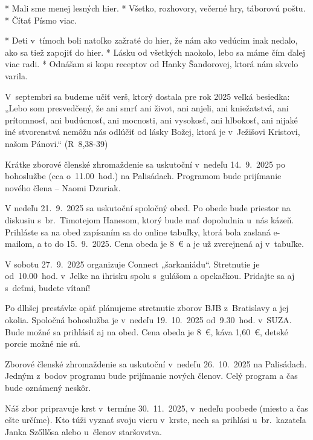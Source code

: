 * Mali sme menej lesných hier.
* Všetko, rozhovory, večerné hry, táborovú poštu.
* Čítať Písmo viac.
\enditems

* Deti v~tímoch boli natoľko zažraté do hier, že nám ako vedúcim inak nedalo, ako sa tiež zapojiť do hier.
* Lásku od všetkých naokolo, lebo sa máme čím ďalej viac radi.
* Odnášam si kopu receptov od Hanky Šandorovej, ktorá nám skvelo varila.
\enditems



V~septembri sa budeme učiť verš, ktorý dostala pre rok 2025 veľká besiedka: „Lebo som presvedčený, že ani smrť ani život, ani anjeli, ani kniežatstvá, ani prítomnosť, ani budúcnosť, ani mocnosti, ani vysokosť, ani hlbokosť, ani nijaké iné stvorenstvá nemôžu nás odlúčiť od lásky Božej, ktorá je v~Ježišovi Kristovi, našom Pánovi.“ (R~8,38-39)


Krátke zborové členské zhromaždenie sa uskutoční v~nedeľu 14.~9.~2025 po bohoslužbe (cca o~11.00~hod.) na Palisádach. Programom bude prijímanie nového člena -- Naomi Dzuriak.


V nedeľu 21.~9.~2025 sa uskutoční spoločný obed. Po obede bude priestor na diskusiu s~br.~Timotejom Hanesom, ktorý bude mať dopoludnia u~nás kázeň. Prihláste sa na obed zapísaním sa do online tabuľky, ktorá bola zaslaná e-mailom, a to do 15.~9.~2025. Cena obeda je 8~€ a je už zverejnená aj v~tabuľke.
\vfill\break


V sobotu 27.~9.~2025 organizuje Connect „šarkaniádu“. Stretnutie je od~10.00~hod. v~Jelke na ihrisku spolu s~gulášom a opekačkou. Pridajte sa aj s~deťmi, budete vítaní!


Po dlhšej prestávke opäť plánujeme stretnutie zborov BJB z~Bratislavy a jej okolia. Spoločná bohoslužba je v~nedeľu 19.~10.~2025 od~9.30~hod. v~SUZA. Bude možné sa prihlásiť aj na obed. Cena obeda je 8~€, káva 1,60~€, detské porcie možné nie sú.


Zborové členské zhromaždenie sa uskutoční v~nedeľu 26.~10.~2025 na Palisádach. Jedným z~bodov programu bude prijímanie nových členov. Celý program a čas bude oznámený neskôr.


Náš zbor pripravuje krst v~termíne 30.~11.~2025, v~nedeľu poobede (miesto a čas ešte určíme). Kto túži vyznať svoju vieru v~krste, nech sa prihlási u~br.~kazateľa Janka Szőllősa alebo u~členov staršovstva.


